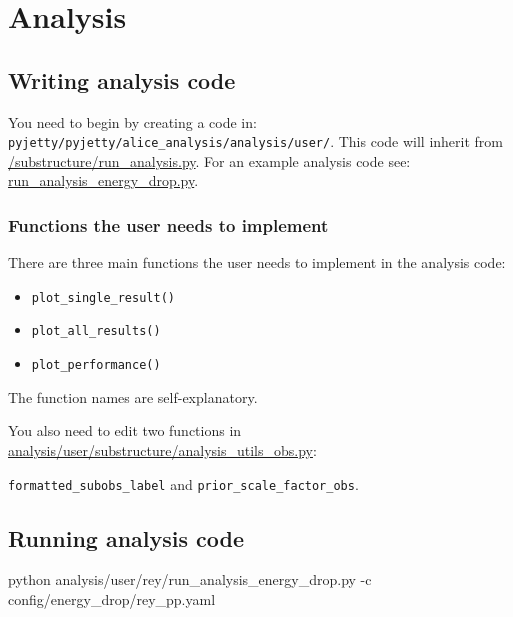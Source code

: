 \documentclass[12pt]{article}
\begin{document}
\section{Analysis}

\subsection{Writing analysis code}

You need to begin by creating a code in: \verb|pyjetty/pyjetty/alice_analysis/analysis/user/|.
This code will inherit from
\href{https://github.com/reynier0611/pyjetty/blob/master/pyjetty/alice_analysis/analysis/user/substructure/run_analysis.py}{/substructure/run\_analysis.py}.
For an example analysis code see: \href{https://github.com/reynier0611/pyjetty/blob/master/pyjetty/alice_analysis/analysis/user/rey/run_analysis_energy_drop.py}{run\_analysis\_energy\_drop.py}.

\subsubsection{Functions the user needs to implement}

There are three main functions the user needs to implement in the analysis code:

\begin{itemize}
\item \verb|plot_single_result()|
\item \verb|plot_all_results()|
\item \verb|plot_performance()|
\end{itemize}

The function names are self-explanatory.

You also need to edit two functions in \href{https://github.com/reynier0611/pyjetty/blob/master/pyjetty/alice_analysis/analysis/user/substructure/analysis_utils_obs.py}{analysis/user/substructure/analysis\_utils\_obs.py}:

\verb|formatted_subobs_label| and \verb|prior_scale_factor_obs|.

\subsection{Running analysis code}

\begin{tcolorbox}
\begin{verbnobox}[\scriptsize]
python analysis/user/rey/run_analysis_energy_drop.py  -c config/energy_drop/rey_pp.yaml
\end{verbnobox}  
\end{tcolorbox}
\end{document}
